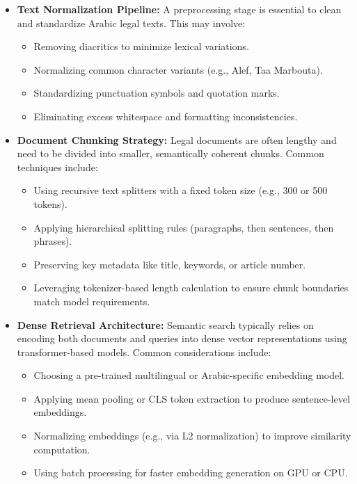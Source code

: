 \begin{itemize}
	\item \textbf{Text Normalization Pipeline:}
	A preprocessing stage is essential to clean and standardize Arabic legal texts. This may involve:
	\begin{itemize}
		\item Removing diacritics to minimize lexical variations.
		\item Normalizing common character variants (e.g., Alef, Taa Marbouta).
		\item Standardizing punctuation symbols and quotation marks.
		\item Eliminating excess whitespace and formatting inconsistencies.
	\end{itemize}
	
	\item \textbf{Document Chunking Strategy:}
	Legal documents are often lengthy and need to be divided into smaller, semantically coherent chunks. Common techniques include:
	\begin{itemize}
		\item Using recursive text splitters with a fixed token size (e.g., 300 or 500 tokens).
		\item Applying hierarchical splitting rules (paragraphs, then sentences, then phrases).
		\item Preserving key metadata like title, keywords, or article number.
		\item Leveraging tokenizer-based length calculation to ensure chunk boundaries match model requirements.
	\end{itemize}
	
	\item \textbf{Dense Retrieval Architecture:}
	Semantic search typically relies on encoding both documents and queries into dense vector representations using transformer-based models. Common considerations include:
	\begin{itemize}
		\item Choosing a pre-trained multilingual or Arabic-specific embedding model.
		\item Applying mean pooling or CLS token extraction to produce sentence-level embeddings.
		\item Normalizing embeddings (e.g., via L2 normalization) to improve similarity computation.
		\item Using batch processing for faster embedding generation on GPU or CPU.
	\end{itemize}
	

\end{itemize}
